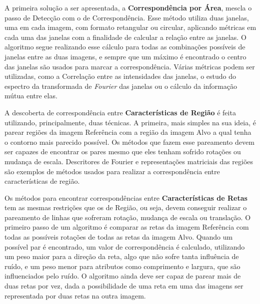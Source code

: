     A primeira solução a ser apresentada, a \textbf{Correspondência por Área}, mescla o passo de Detecção com o de 
Correspondência. Esse método utiliza duas janelas, uma em cada imagem, com formato retangular ou circular, aplicando
métricas em cada uma das janelas com a finalidade de calcular a relação entre as janelas. O algoritmo segue realizando
esse cálculo para todas as combinações possíveis de janelas entre as duas imagens, e sempre que um máximo é encontrado
o centro das janelas são usados para marcar a correspondência. Várias métricas podem ser utilizadas, como a 
Correlação entre as intensidades das janelas, o estudo do espectro da transformada de \textit{Fourier} das janelas ou 
o cálculo da informação mútua entre elas.

    A descoberta de correspondência entre \textbf{Características de Região} é feita utilizando, principalmente, duas 
técnicas. A primeira, mais simples na sua ideia, é parear regiões da imagem Referência com a região da imagem Alvo a qual
tenha o contorno mais parecido possível. Os métodos que fazem esse pareamento devem ser capazes de encontrar os pares mesmo
que eles tenham sofrido rotações ou mudança de escala. Descritores de Fourier e representações matriciais das regiões são
exemplos de métodos usados para realizar a correspondência entre características de região.

    Os métodos para encontrar correspondências entre \textbf{Características de Retas} tem as mesmas restrições que os
de Região, ou seja, devem conseguir realizar o pareamento de linhas que sofreram rotação, mudança de escala ou translação.
O primeiro passo de um algoritmo é comparar as retas da imagem Referência com todas as possíveis rotações de todas as retas
da imagem Alvo. Quando um possível par é encontrado, um valor de correspondência é calculado, utilizando um peso maior para
a direção da reta, algo que não sofre tanta influência de ruído, e um peso menor para atributos como comprimento e largura,
que são influenciados pelo ruído. O algoritmo ainda deve ser capaz de parear mais de duas retas por vez, dada a possibilidade
de uma reta em uma das imagens ser representada por duas retas na outra imagem.

